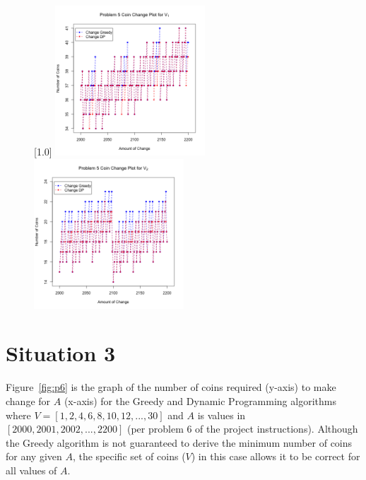 \documentclass[11pt]{scrreprt}
\begin{document}
\begin{figure}[!htbp]
	\captionsetup{justification=centering,singlelinecheck=off}
	\captionsetup[subfigure]{singlelinecheck=on}
	[1.0\textwidth]
	{%
		\includegraphics[width=0.50\textwidth]{situation2_1.png}%
		\includegraphics[width=0.50\textwidth]{situation2_2.png}
	}%
\end{figure}

\newpage
\section{Situation 3}
\label{sec:sit3}

Figure~\ref{fig:p6} is the graph of the number of coins required (y-axis) to make change for $A$ (x-axis) for the Greedy and Dynamic Programming algorithms where $V = [1, 2, 4, 6, 8, 10, 12, ..., 30]$ and $A$ is values in $[2000, 2001, 2002, ..., 2200]$ (per problem 6 of the project instructions). Although the Greedy algorithm is not guaranteed to derive the minimum number of coins for any given $A$, the specific set of coins ($V$) in this case allows it to be correct for all values of $A$.
\end{document}
